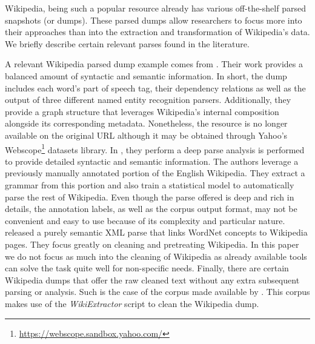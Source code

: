Wikipedia, being such a popular resource  already has various off-the-shelf parsed snapshots (or dumps). These parsed dumps allow researchers to focus more into their approaches than into the extraction and transformation of Wikipedia's data.  We briefly describe certain relevant parses found in the literature.   
%



A relevant Wikipedia parsed dump example comes from \cite{ATSERIAS08}. Their work provides a balanced amount of syntactic and semantic information. In short, the dump includes each word's part of speech tag, their dependency relations as well as the output of three different named entity recognition parsers. Additionally, they provide a graph structure that leverages Wikipedia's internal composition alongside its corresponding metadata. Nonetheless, the resource is no longer available on the original URL although it may be obtained through Yahoo's Webscope\footnote{\url{https://webscope.sandbox.yahoo.com/}} datasets library.  In \cite{FLICKINGER10}, they perform a deep parse analysis is performed to provide detailed syntactic and semantic information. The authors leverage a previously manually annotated portion of the English Wikipedia. They extract a grammar from this portion and also train a statistical model  to automatically parse the rest of Wikipedia. Even though the parse offered is deep and rich in details, the annotation labels, as well as the corpus output format, may not be convenient and easy to use because of its complexity and particular nature. \cite{SchenkelSK07}  released a purely semantic XML parse that links WordNet concepts to Wikipedia pages. They focus greatly on cleaning and pretreating Wikipedia. In this paper we do not focus as much into the cleaning of Wikipedia as already available tools can solve the task quite well for non-specific needs. 
Finally, there are certain Wikipedia dumps that offer the raw cleaned text without any extra subsequent parsing or analysis. Such is the case of the corpus made available by \cite{westbury2010}. This corpus makes  use of the \textit{WikiExtractor} script  \cite{Attardi2015} to clean the Wikipedia dump.
  
